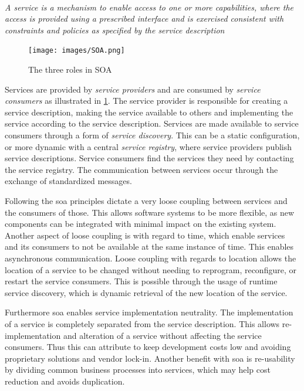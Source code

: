 \paragraph{}
\textit{
A service is a mechanism to enable access to one or more capabilities, where the
access is  provided using a prescribed interface and is exercised consistent
with constraints and policies as  specified by the service description
}

\begin{figure}[h]
\texttt{[image: images/SOA.png]}
\caption{The three roles in SOA}
\label{figure-soa-roles}
\end{figure}

Services are provided by \textit{service providers} and are consumed by
\textit{service consumers} as illustrated in \cref{figure-soa-roles}. The
service provider is responsible for creating a service description, making the
service available to others and implementing the service according to the
service description. Services are made available to service consumers through a
form of \textit{service discovery}. This can be a static configuration, or more
dynamic with a central \textit{service registry}, where service providers
publish service descriptions. Service consumers find the services they need by
contacting the service registry. The communication between services occur
through the exchange of standardized messages.

Following the \gls{soa} principles dictate a very loose coupling between
services and the consumers of those. This allows software systems to be more
flexible, as new components can be integrated with minimal impact on the
existing system. Another aspect of loose coupling is with regard to time, which
enable services and its consumers to not be available at the same instance of
time. This enables asynchronous communication. Loose coupling with regards to
location allows the location of a service to be changed without needing to
reprogram, reconfigure, or restart the service consumers. This is possible
through the usage of runtime service discovery, which is dynamic retrieval of
the new location of the service.

Furthermore \gls{soa} enables service implementation neutrality. The
implementation of a service is completely separated from the service
description. This allows re-implementation and alteration of a service without
affecting the service consumers. Thus this can attribute to keep development
costs low and avoiding proprietary solutions and vendor lock-in. Another
benefit with \gls{soa} is re-usability by dividing common business processes
into services, which may help cost reduction and avoids duplication.

